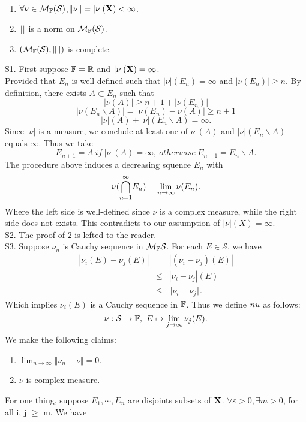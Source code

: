 \begin{Proof} \
\begin{enumerate}
	\item $\forall \nu \in \mathcal{M}_{\mathbb{F}}(\mathcal S)$,$\Vert \nu \Vert=|\nu|(\mathbf{X}) <  \infty$.
	\item $\Vert \Vert$ is a norm on $\mathcal{M}_{\mathbb{F}}(\mathcal S)$.
	\item $(\mathcal{M}_{\mathbb{F}}(\mathcal S),\Vert \Vert)$ is complete. 
\end{enumerate}
S1. First suppose $\mathbb{F}=\mathbb{R}$ and $| \nu|(\mathbf{X})=\infty$. \\
Provided that $E_n$ is well-defined such that $|\nu|(E_n)=\infty$ and $|\nu(E_n)|\geq n$.
By definition, there exists $A \subset E_n$ such that
$$
|\nu(A)| \geq n+1 + |\nu(E_n)|
$$
$$
|\nu(E_n \backslash A)| = |\nu(E_n)-\nu(A)| \geq n+1
$$
$$
|\nu|(A) + |\nu|(E_n\backslash A) = \infty.
$$
Since $|\nu|$ is a measure, we conclude at least one of $\nu|(A)$ and $|\nu|(E_n\backslash A)$ equals $\infty$. Thus we take
$$
E_{n+1} = A  \ if \  |\nu|(A)=\infty, \ otherwise \ E_{n+1} = E_n \backslash A.
$$
The procedure above induces a decreasing squence $E_n$ with
$$
\nu({\bigcap_{n=1}^{\infty}}E_n) = \lim_{n \to \infty}\nu(E_n).
$$
Where the left side is well-defined since $\nu$ is a complex measure, while the right side does not exists. This contradicts to our assumption of $|\nu|(X)=\infty$. \\
S2. The proof of 2 is lefted to the reader. \\
S3. Suppose $\nu_n$ is Cauchy sequence in $\mathcal{M}_{\mathbb{F}} \mathcal S$. For each $E\in \mathcal S$, we have
\begin{eqnarray*}
	|\nu_i(E)-\nu_j(E)| &=& |(\nu_i-\nu_j)(E)| \\
	&\leq & |\nu_i-\nu_j|(E) \\
	&\leq & \Vert \nu_i - \nu_j \Vert.
\end{eqnarray*}
Which implies $\nu_i(E)$ is a Cauchy sequence in $\mathbb{F}$. Thus we define $\\nu$ as follows:
$$
\nu: \mathcal{S} \to \mathbb{F}, \ E \mapsto \lim_{j \to \infty}\nu_j(E).
$$
We make the following claims:
\begin{enumerate}
	\item $\lim_{n\to \infty} \Vert \nu_n-\nu\Vert =0$.
	\item $\nu$ is complex measure.
\end{enumerate}
For one thing, suppose $E_1,\cdots,E_n$ are disjoints subsets of $\mathbf{X}$. $\forall \varepsilon >0,\exists m >0$, for all i, j $\geq$ m. We have
\begin{eqnarray*}

\end{eqnarray*}
\end{Proof}
